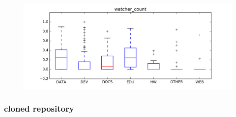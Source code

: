 \documentclass[a4paper]{scrartcl}
\begin{document}
\begin{description}
				\begin{figure}[h!]
					\centering
					\includegraphics[width=0.75\linewidth]{figures/watcher_count.png}
				\end{figure}
		\end{description}
		

		\subsubsection{cloned repository} %
		\label{ssub:cloned_repository}

		
\end{document}
